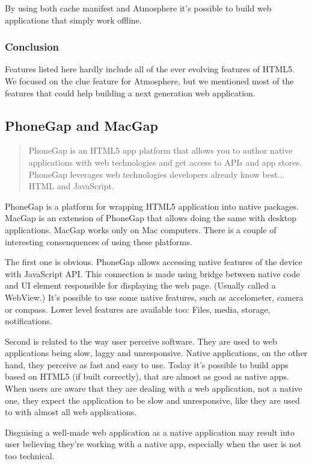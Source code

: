 By using both cache manifest and Atmosphere it’s possible to build web applications that simply work offline. 

\subsubsection{Conclusion}

Features listed here hardly include all of the ever evolving features of HTML5. We focused on the clue feature for Atmosphere, but we mentioned most of the features that could help building a next generation web application.

\subsection{PhoneGap and MacGap}

\begin{quotation}
PhoneGap is an HTML5 app platform that allows you to author native applications with web technologies and get access to APIs and app stores. PhoneGap leverages web technologies developers already know best... HTML and JavaScript. \citep{phonegap}
\end{quotation}

PhoneGap is a platform for wrapping HTML5 application into native packages. MacGap is an extension of PhoneGap that allows doing the same with desktop applications. MacGap works only on Mac computers.  There is a couple of interesting consenquences of using these platforms.

The first one is obvious. PhoneGap allows accessing native features of the device with JavaScript API. This connection is made using bridge between native code and UI element responsible for displaying the web page. (Usually called a WebView.) It’s possible to use some native features, such as accelometer, camera or compass. Lower level features are available too: Files, media, storage, notifications. 

Second is related to the way user perceive software. They are used to web applications being slow, laggy and unresponsive. Native applications, on the other hand, they perceive as fast and easy to use. Today it’s possible to build apps based on HTML5 (if built correctly), that are almost as good as native apps. When users are aware that they are dealing with a web application, not a native one, they expect the application to be slow and unresponsive, like they are used to with almost all web applications. 

Disguising a well-made web application as a native application may result into user believing they’re working with a native app, especially when the user is not too technical.

